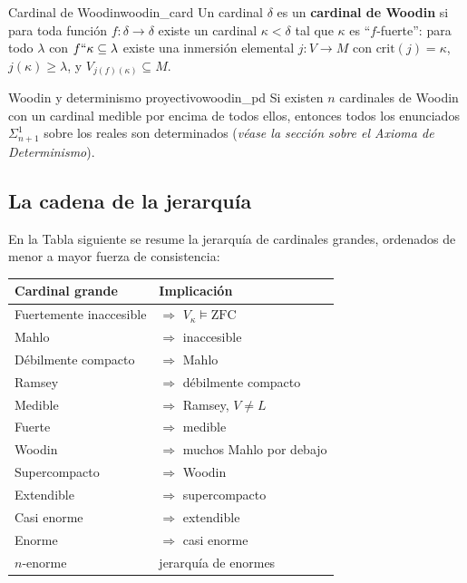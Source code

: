 \begin{definicion}{Cardinal de Woodin}{woodin_card}
Un cardinal $\delta$ es un \textbf{cardinal de Woodin} si para toda función $f: \delta \to \delta$ existe un cardinal $\kappa < \delta$ tal que $\kappa$ es ``$f$-fuerte'': para todo $\lambda$ con $f``\kappa \subseteq \lambda$ existe una inmersión elemental $j: V \to M$ con $\mathrm{crit}(j) = \kappa$, $j(\kappa) \geq \lambda$, y $V_{j(f)(\kappa)} \subseteq M$.
\end{definicion}

\begin{teorema}{Woodin y determinismo proyectivo}{woodin_pd}
Si existen $n$ cardinales de Woodin con un cardinal medible por encima de todos ellos, entonces todos los enunciados $\Sigma^1_{n+1}$ sobre los reales son determinados (\textit{véase la sección sobre el Axioma de Determinismo}).
\end{teorema}

\subsection{La cadena de la jerarquía}

En la Tabla siguiente se resume la jerarquía de cardinales grandes, ordenados de menor a mayor fuerza de consistencia:

\begin{center}
\begin{tabular}{ll}
\hline
\textbf{Cardinal grande} & \textbf{Implicación} \\
\hline
Fuertemente inaccesible & $\Rightarrow$ $V_\kappa \models \mathrm{ZFC}$ \\
Mahlo & $\Rightarrow$ inaccesible \\
Débilmente compacto & $\Rightarrow$ Mahlo \\
Ramsey & $\Rightarrow$ débilmente compacto \\
Medible & $\Rightarrow$ Ramsey, $V \neq L$ \\
Fuerte & $\Rightarrow$ medible \\
Woodin & $\Rightarrow$ muchos Mahlo por debajo \\
Supercompacto & $\Rightarrow$ Woodin \\
Extendible & $\Rightarrow$ supercompacto \\
Casi enorme & $\Rightarrow$ extendible \\
Enorme & $\Rightarrow$ casi enorme \\
$n$-enorme & jerarquía de enormes \\
\hline
\end{tabular}
\end{center}

